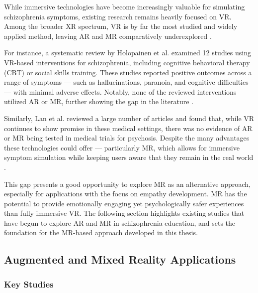 While immersive technologies have become increasingly valuable for simulating schizophrenia symptoms, existing research remains heavily focused on VR. Among the broader XR spectrum, VR is by far the most studied and widely applied method, leaving AR and MR comparatively underexplored \cite{Kuhail2022}.

For instance, a systematic review by Holopainen et al. examined 12 studies using VR-based interventions for schizophrenia, including cognitive behavioral therapy (CBT) or social skills training. These studies reported positive outcomes across a range of symptoms — such as hallucinations, paranoia, and cognitive difficulties — with minimal adverse effects. Notably, none of the reviewed interventions utilized AR or MR, further showing the gap in the literature \cite{Holopainen2023}.

Similarly, Lan et al. reviewed a large number of articles and found that, while VR continues to show promise in these medical settings, there was no evidence of AR or MR being tested in medical trials for psychosis. Despite the many advantages these technologies could offer — particularly MR, which allows for immersive symptom simulation while keeping users aware that they remain in the real world \cite{Lan2023}.

This gap presents a good opportunity to explore MR as an alternative approach, especially for applications with the focus on empathy development. MR has the potential to provide emotionally engaging yet psychologically safer experiences than fully immersive VR. The following section highlights existing studies that have begun to explore AR and MR in schizophrenia education, and sets the foundation for the MR-based approach developed in this thesis.


\subsection{Augmented and Mixed Reality Applications}
\subsubsection{Key Studies}
\label{sec:keystudies}

